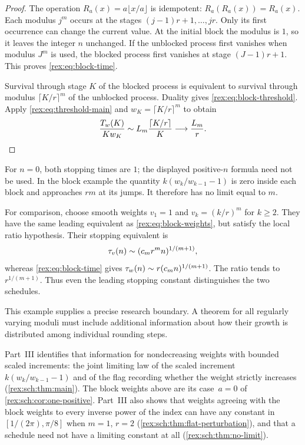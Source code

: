 \begin{proof}
The operation $R_a(x)=a\lfloor x/a\rfloor$ is idempotent:
$R_a(R_a(x))=R_a(x)$. Each modulus $j^m$ occurs at the stages
$(j-1)r+1,\ldots,jr$. Only its first occurrence can change the
current value. At the initial block the modulus is $1$, so it leaves
the integer $n$ unchanged. If the unblocked process first vanishes
when modulus $J^m$ is used, the blocked process first vanishes at
stage $(J-1)r+1$. This proves \cref{rex:eq:block-time}.

Survival through stage $K$ of the blocked process is equivalent to
survival through modulus $\lceil K/r\rceil^m$ of the unblocked
process. Duality gives \cref{rex:eq:block-threshold}. Apply
\cref{rex:eq:threshold-main} and
$w_K=\lceil K/r\rceil^m$ to obtain
\[
 \frac{T_w(K)}{K w_K}
 \mathrel{\sim} L_m\frac{\lceil K/r\rceil}{K}\longrightarrow\frac{L_m}{r}.
\]
\end{proof}

For $n=0$, both stopping times are $1$; the displayed positive-$n$
formula need not be used. In the block example the quantity
$k(w_k/w_{k-1}-1)$ is zero inside each block and approaches $rm$
at its jumps. It therefore has no limit equal to $m$.

For comparison, choose smooth weights $v_1=1$ and
$v_k=(k/r)^m$ for $k\geq2$. They have the same leading equivalent
as \cref{rex:eq:block-weights}, but satisfy the local ratio hypothesis.
Their stopping equivalent is
\[
 \tau_v(n)\mathrel{\sim}(c_m r^m n)^{1/(m+1)},
\]
whereas \cref{rex:eq:block-time} gives
$\tau_w(n)\mathrel{\sim} r(c_m n)^{1/(m+1)}$.
The ratio tends to $r^{1/(m+1)}$. Thus even the leading stopping
constant distinguishes the two schedules.

This example supplies a precise research boundary. A theorem for all
regularly varying moduli must include additional information about how
their growth is distributed among individual rounding steps.

\begin{writenote}
Part~III identifies that information for nondecreasing weights with
bounded scaled increments: the joint limiting law of the scaled increment
$k(w_k/w_{k-1}-1)$ and of the flag recording whether the weight strictly
increases (\cref{rex:sch:thm:main}). The block weights above are its
case~$a=0$ of \cref{rex:sch:cor:one-positive}. Part~III also shows that
weights agreeing with the block weights to every inverse power of the index
can have any constant in $[1/(2\pi),\pi/8]$ when $m=1$, $r=2$
(\cref{rex:sch:thm:flat-perturbation}), and that a schedule need not have
a limiting constant at all (\cref{rex:sch:thm:no-limit}).
\end{writenote}
